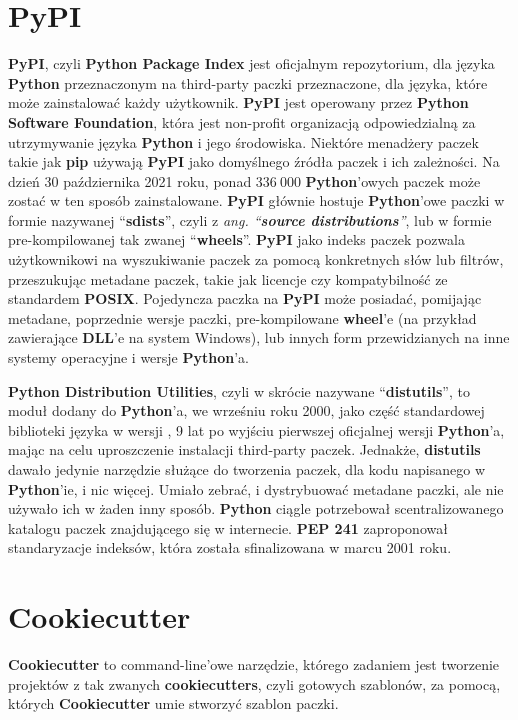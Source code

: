 \section{PyPI}

\textbf{PyPI}, \cite{PyPI} \cite{AdvancedPythonDevelopment} czyli \textbf{Python Package Index} jest oficjalnym repozytorium, dla języka \textbf{Python} przeznaczonym na third-party paczki przeznaczone, dla języka, które może zainstalować każdy użytkownik. \textbf{PyPI} jest operowany przez \textbf{Python Software Foundation}, która jest non-profit organizacją odpowiedzialną za utrzymywanie języka \textbf{Python} i jego  środowiska. Niektóre menadżery paczek takie jak \textbf{pip} \cite{Pip} używają \textbf{PyPI} jako domyślnego źródła paczek i ich zależności. Na dzień 30 października 2021 roku, ponad $336 \ 000$ \textbf{Python}'owych paczek może zostać w ten sposób zainstalowane. \textbf{PyPI} głównie hostuje \textbf{Python}'owe paczki w formie nazywanej ``\textbf{sdists}'', czyli z \textit{ang. ``\textbf{source distributions}''}, lub w formie pre-kompilowanej tak zwanej ``\textbf{wheels}''. \textbf{PyPI} jako indeks paczek pozwala użytkownikowi na wyszukiwanie paczek za pomocą konkretnych słów lub filtrów, przeszukując metadane paczek, takie jak licencje czy kompatybilność ze standardem \textbf{POSIX}. Pojedyncza paczka na \textbf{PyPI} może posiadać, pomijając metadane, poprzednie wersje paczki, pre-kompilowane \textbf{wheel}'e (na przykład zawierające \textbf{DLL}'e na system Windows), lub innych form przewidzianych na inne systemy operacyjne i wersje \textbf{Python}'a.

\textbf{Python Distribution Utilities}, czyli w skrócie nazywane ``\textbf{distutils}'', to moduł dodany do \textbf{Python}'a, we wrześniu roku 2000, jako część standardowej biblioteki języka w wersji , 9 lat po wyjściu pierwszej oficjalnej wersji \textbf{Python}'a, mając na celu uproszczenie instalacji third-party paczek.
Jednakże, \textbf{distutils} dawało jedynie narzędzie służące do tworzenia paczek, dla kodu napisanego w \textbf{Python}'ie, i nic więcej. Umiało zebrać, i dystrybuować metadane paczki, ale nie używało ich w żaden inny sposób. \textbf{Python} ciągle potrzebował scentralizowanego katalogu paczek znajdującego się w internecie. \textbf{PEP 241} \cite{PEP241} zaproponował standaryzacje indeksów, która została sfinalizowana w marcu 2001 roku.


\clearpage

\section{Cookiecutter}
\textbf{Cookiecutter} to command-line'owe narzędzie, którego zadaniem jest tworzenie projektów z tak zwanych \textbf{cookiecutters}, czyli gotowych szablonów, za pomocą, których \textbf{Cookiecutter} umie stworzyć szablon paczki.

